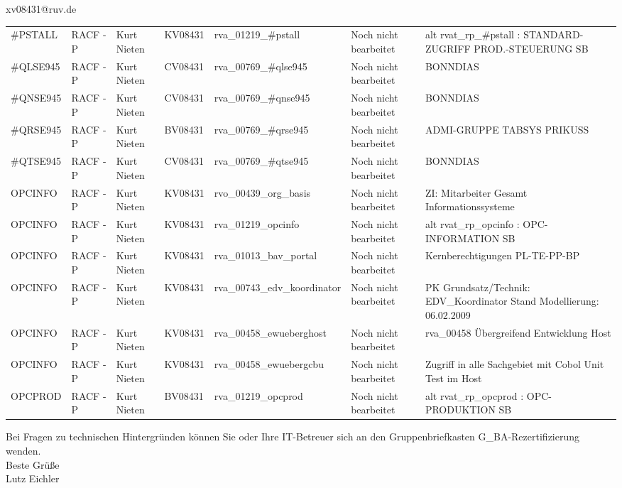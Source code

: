 \documentclass[a4paper,landscape,12pt]{letter}
\begin{document}
\begin{letter}{xv08431@ruv.de\hfill \break}
\begin{tiny}
\begin{longtable}{|p{35mm}|p{15mm}|p{25mm}|p{10mm}|p{40mm}|p{50mm}|p{50mm}|}
\#PSTALL & RACF - P & Kurt Nieten & KV08431 & rva\_01219\_\#pstall & Noch nicht bearbeitet & alt rvat\_rp\_\#pstall          : STANDARD-ZUGRIFF PROD.-STEUERUNG SB \\
\#QLSE945 & RACF - P & Kurt Nieten & CV08431 & rva\_00769\_\#qlse945 & Noch nicht bearbeitet & BONNDIAS \\
\#QNSE945 & RACF - P & Kurt Nieten & CV08431 & rva\_00769\_\#qnse945 & Noch nicht bearbeitet & BONNDIAS \\
\#QRSE945 & RACF - P & Kurt Nieten & BV08431 & rva\_00769\_\#qrse945 & Noch nicht bearbeitet & ADMI-GRUPPE TABSYS PRIKUSS \\
\#QTSE945 & RACF - P & Kurt Nieten & CV08431 & rva\_00769\_\#qtse945 & Noch nicht bearbeitet & BONNDIAS \\
OPCINFO & RACF - P & Kurt Nieten & KV08431 & rvo\_00439\_org\_basis & Noch nicht bearbeitet & ZI: Mitarbeiter Gesamt Informationssysteme \\
OPCINFO & RACF - P & Kurt Nieten & KV08431 & rva\_01219\_opcinfo & Noch nicht bearbeitet & alt rvat\_rp\_opcinfo          : OPC- INFORMATION                         SB \\
OPCINFO & RACF - P & Kurt Nieten & KV08431 & rva\_01013\_bav\_portal & Noch nicht bearbeitet & Kernberechtigungen PL-TE-PP-BP \\
OPCINFO & RACF - P & Kurt Nieten & KV08431 & rva\_00743\_edv\_koordinator & Noch nicht bearbeitet & PK Grundsatz/Technik: EDV\_Koordinator Stand Modellierung: 06.02.2009 \\
OPCINFO & RACF - P & Kurt Nieten & KV08431 & rva\_00458\_ewueberghost & Noch nicht bearbeitet & rva\_00458 Übergreifend Entwicklung Host \\
OPCINFO & RACF - P & Kurt Nieten & KV08431 & rva\_00458\_ewuebergcbu & Noch nicht bearbeitet & Zugriff in alle Sachgebiet mit Cobol Unit Test im Host \\
OPCPROD & RACF - P & Kurt Nieten & BV08431 & rva\_01219\_opcprod & Noch nicht bearbeitet & alt rvat\_rp\_opcprod          : OPC-PRODUKTION                           SB \\

\hline
		\end{longtable}
		\end{tiny}
	
\begin{minipage}{\textwidth}
			Bei Fragen zu technischen Hintergründen können Sie 
			oder Ihre IT-Betreuer sich an den Gruppenbriefkasten 
			G\_BA-Rezertifizierung
			wenden.\\
			\linebreak
			Beste Grüße\\
			Lutz Eichler
	\end{minipage}
	\end{letter}
	
\end{document}
